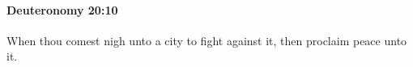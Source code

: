 
		\paragraph{Deuteronomy 20:10} %
			\label{DEUTERONOMY-20-10}

			When thou comest nigh unto a city to fight against it, then proclaim peace unto it.


